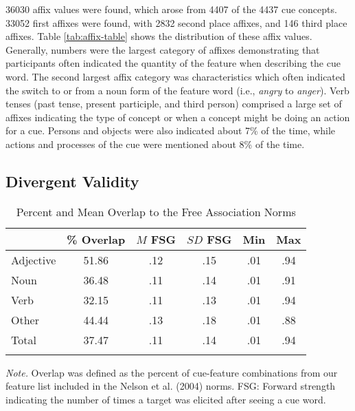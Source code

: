 \documentclass[english,,man]{apa6}
\theoremstyle{definition}
\theoremstyle{definition}
\theoremstyle{definition}
\theoremstyle{remark}
\begin{document}
36030 affix values were found, which arose from 4407 of the 4437 cue
concepts. 33052 first affixes were found, with 2832 second place
affixes, and 146 third place affixes. Table \ref{tab:affix-table} shows
the distribution of these affix values. Generally, numbers were the
largest category of affixes demonstrating that participants often
indicated the quantity of the feature when describing the cue word. The
second largest affix category was characteristics which often indicated
the switch to or from a noun form of the feature word (i.e.,
\emph{angry} to \emph{anger}). Verb tenses (past tense, present
participle, and third person) comprised a large set of affixes
indicating the type of concept or when a concept might be doing an
action for a cue. Persons and objects were also indicated about 7\% of
the time, while actions and processes of the cue were mentioned about
8\% of the time.

\hypertarget{divergent-validity}{%
\subsection{Divergent Validity}\label{divergent-validity}}

\begin{table}[tbp]
\begin{center}
\begin{threeparttable}
\caption{\label{tab:divergent-table}Percent and Mean Overlap to the Free Association Norms}
\begin{tabular}{lccccc}
\toprule
  & \% Overlap & $M$ FSG & $SD$ FSG & Min & Max\\
\midrule
Adjective & 51.86 & .12 & .15 & .01 & .94\\
Noun & 36.48 & .11 & .14 & .01 & .91\\
Verb & 32.15 & .11 & .13 & .01 & .94\\
Other & 44.44 & .13 & .18 & .01 & .88\\
Total & 37.47 & .11 & .14 & .01 & .94\\
\bottomrule
\addlinespace
\end{tabular}
\begin{tablenotes}[para]
\normalsize{\textit{Note.} Overlap was defined as the percent of cue-feature combinations from our feature list included in the Nelson et al. (2004) norms. FSG: Forward strength indicating the number of times a target was elicited after seeing a cue word.}
\end{tablenotes}
\end{threeparttable}
\end{center}
\end{table}
\end{document}
